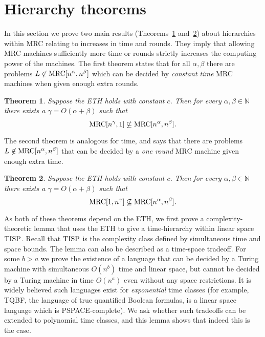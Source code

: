 \documentclass[11pt]{article}
\newtheorem{theorem}{Theorem}
\theoremstyle{definition}
\theoremstyle{remark}
\newcommand{\mrc}{\textup{MRC}}
\newcommand{\TISP}{\textup{TISP}}
\begin{document}
\section{Hierarchy theorems}\label{sec:hierarchy}

In this section we prove two main results
(Theorems~\ref{thm:roundhierarchy} and~\ref{thm:timehierarchy}) about
hierarchies within MRC relating to increases in time and rounds.
They imply that allowing MRC machines sufficiently more time or rounds
strictly increases the computing power of the machines.
The first
theorem states that for all $\alpha, \beta$ there are problems $L \not \in
\mrc[n^\alpha, n^\beta]$ which can be decided by \emph{constant time} MRC
machines when given enough extra rounds.

\begin{theorem} \label{thm:roundhierarchy}
Suppose the ETH holds with constant $c$. Then for every $\alpha,\beta\in\mathbb N$
there exists a $\gamma = O(\alpha + \beta)$ such that $$\mrc[n^\gamma,1]
\not\subseteq \mrc[n^\alpha, n^\beta].$$
\end{theorem}

The second theorem is analogous for time, and says that there are problems $L
\not \in \mrc[n^\alpha, n^\beta]$ that can be decided by a \emph{one round} MRC
machine given enough extra time.

\begin{theorem} \label{thm:timehierarchy}
Suppose the ETH holds with constant $c$. Then for every $\alpha,\beta\in\mathbb N$
there exists a $\gamma = O(\alpha + \beta)$ such that $$\mrc[1, n^\gamma]
\not\subseteq \mrc[n^\alpha, n^\beta].$$
\end{theorem}

As both of these theorems depend on the ETH, we first prove a complexity-theoretic
lemma that uses the ETH to give a time-hierarchy within linear space $\TISP$.
Recall that $\TISP$ is the complexity class defined by simultaneous time and 
space bounds.
The lemma can also be described as a time-space tradeoff.
For some $b > a$ we prove
the existence of a language that can be decided by a Turing machine with
simultaneous $O(n^b)$ time and linear space, but cannot be decided by a Turing
machine in time $O(n^a)$ even without any space restrictions. It is widely
believed such languages exist for \emph{exponential} time classes (for example,
TQBF, the language of true quantified Boolean formulas, is a linear space
language which is PSPACE-complete). We ask whether such tradeoffs can be
extended to polynomial time classes, and this lemma shows that indeed this is
the case.
\end{document}

